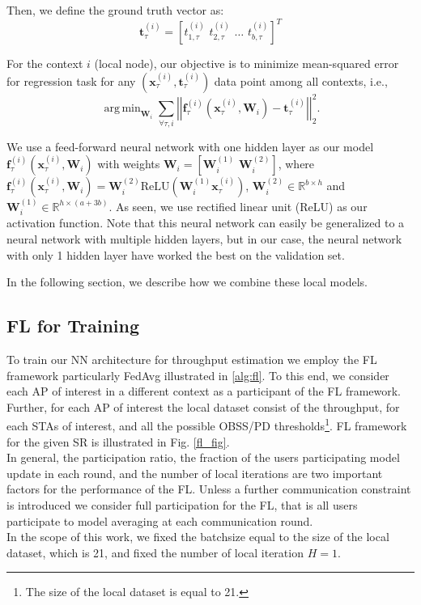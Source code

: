\documentclass[journal]{IEEEtran}
\DeclareMathOperator*{\argmin}{arg\,min}
\renewcommand{\vec}[1]{\boldsymbol{#1}}
\newcommand{\norm}[1]{\left|\left|#1\right|\right|}
\begin{document}
Then, we define the ground truth vector as:
\begin{equation*}
    \vec{t}^{(i)}_\tau = \left[ t_{1, \tau}^{(i)} \, \, t_{2, \tau}^{(i)} \, \,  \ldots \, \, t_{b, \tau}^{(i)} \right]^T
\end{equation*}

For the context $i$ (local node), our objective is to minimize mean-squared error for regression task for any $(\vec{x}_\tau^{(i)}, \vec{t}^{(i)}_\tau)$ data point among all contexts, i.e.,
\begin{equation*}
\argmin_{\vec{W}_i} \sum_{\forall \tau,i}  \norm{\vec{f}^{(i)}_\tau (\vec{x}_\tau^{(i)}, \vec{W}_i ) - \vec{t}^{(i)}_\tau}_2^2.
\end{equation*}

We use a feed-forward neural network with one hidden layer as our model $\vec{f}^{(i)}_\tau (\vec{x}_\tau^{(i)}, \vec{W}_i)$ with weights $\vec{W}_i = \left[  \vec{W}_i^{(1)} \, \, \vec{W}_i^{(2)} \right]$, where $\vec{f}^{(i)}_\tau (\vec{x}_\tau^{(i)}, \vec{W}_i) = \vec{W}_i^{(2)} \mathrm{ReLU} ( \vec{W}_i^{(1)}\vec{x}_\tau^{(i)}) $, $\vec{W}_i^{(2)} \in \mathbb{R}^{b \times h}$ and  $\vec{W}_i^{(1)} \in \mathbb{R}^{h \times (a+3b)}$. As seen, we use rectified linear unit (ReLU) as our activation function. Note that this neural network can easily be generalized to a neural network with multiple hidden layers, but in our case, the neural network with only 1 hidden layer have worked the best on the validation set.

In the following section, we describe how we combine these local models.

\subsection{FL for Training}
To train our NN architecture for throughput estimation we employ the FL framework particularly FedAvg illustrated in \ref{alg:fl}. To this end,
 we consider each AP of interest in a different context as a participant of the FL framework. Further, for each AP of interest the local dataset consist of the throughput, for each STAs of interest, and all the possible OBSS/PD thresholds\footnote{The size of the local dataset is equal to 21.}. FL framework for the given SR is illustrated in Fig. \ref{fl_fig}.\\
 \indent In general, the participation ratio, the fraction of the users participating model update in each round, and the number of local iterations are two important factors for the performance of the FL. Unless a further communication constraint is introduced we consider full participation for the FL, that is all users participate to model averaging at each communication round.\\
 \indent In the scope of this work, we fixed the batchsize equal to the size of the local dataset, which is 21, and fixed the number of local iteration $H=1$.
 
\end{document}

